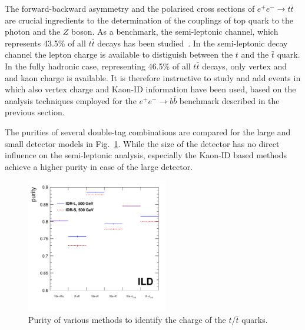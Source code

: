 The forward-backward asymmetry and the polarised cross sections of $e^+e^- \to t\bar{t}$ are crucial ingredients to the determination of the couplings of top quark to the photon and the $Z$ boson. 
As a benchmark, the semi-leptonic channel, which represents 43.5\% of all $t \bar t$ decays has been studied~\cite{ILDNote:bbtt}. In the semi-leptonic decay channel the lepton charge is available to distiguish between the $t$ and the $\bar{t}$ quark. In the fully hadronic case, representing 46.5\% of all $t\bar t$ decays, only vertex and and kaon charge is available. It is therefore instructive to study and add events in which also vertex charge and Kaon-ID information have been used, based on the analysis techniques employed for the $e^+e^- \to b\bar{b}$ benchmark described in the previous section.

The purities of several double-tag combinations are compared for the large and small detector models in Fig.~\ref{fig:ttbar:effi}. While the size of the detector has no direct influence on the semi-leptonic analysis, especially the Kaon-ID based methods achieve a higher purity in case of the large detector. 


\begin{figure}[htbp]
\begin{center} \includegraphics[width=0.55\textwidth]{Performance/fig/p_value_l5_ele_mu_noLcut-v1.pdf}
\end{center}
\caption{Purity of various methods to identify the charge of the $t$/$\bar{t}$ quarks.}
\label{fig:ttbar:effi}
\end{figure}


